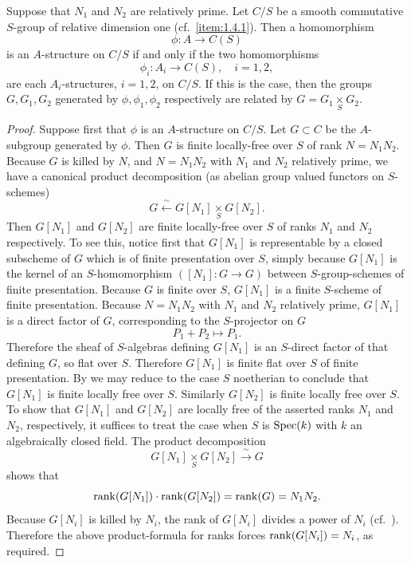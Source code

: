 \begin{proposition}\label{prop:1.7.2}
Suppose that $N_1$ and $N_2$ are relatively prime. Let $C/S$ be a smooth commutative $S$-group of relative dimension one (cf.~\ref{item:1.4.1}). Then a homomorphism
\[
\phi : A \to C(S)
\]
is an $A$-structure on $C/S$ if and only if the two homomorphisms
\[
\phi_i : A_i \to C(S), \quad i = 1, 2,
\]
are each $A_i$-structures, $i = 1, 2$, on $C/S$. If this is the case, then the groups $G, G_1, G_2$ generated by $\phi, \phi_1, \phi_2$ respectively are related by $G = G_1 \underset{S}{\times} G_2$.
\end{proposition}

\begin{proof}
Suppose first that $\phi$ is an $A$-structure on $C/S$. Let $G \subset C$ be the $A$-subgroup generated by $\phi$. Then $G$ is finite locally-free over $S$ of rank $N = N_1 N_2$. Because $G$ is killed by $N$, and $N = N_1 N_2$ with $N_1$ and $N_2$ relatively prime, we have a canonical product decomposition (as abelian group valued functors on $S$-schemes)
\[
G \xleftarrow{\ \sim\ } G[N_1] \underset{S}{\times} G[N_2].
\]
Then $G[N_1]$ and $G[N_2]$ are finite locally-free over $S$ of ranks $N_1$ and $N_2$ respectively. To see this, notice first that $G[N_1]$ is representable by a closed subscheme of $G$ which is of finite presentation over $S$, simply because $G[N_1]$ is the kernel of an $S$-homomorphism $([N_1] : G \to G)$ between $S$-group-schemes of finite presentation. Because $G$ is finite over $S$, $G[N_1]$ is a finite $S$-scheme of finite presentation. Because $N = N_1 N_2$ with $N_1$ and $N_2$ relatively prime, $G[N_1]$ is a direct factor of $G$, corresponding to the $S$-projector on $G$
\[
P_1 + P_2 \mapsto P_1.
\]
Therefore the sheaf of $S$-algebras defining $G[N_1]$ is an $S$-direct factor of that defining $G$, so flat over $S$. Therefore $G[N_1]$ is finite flat over $S$ of finite presentation. By \cite[IV, 8.9.1 and 11.2.6.1]{EGA} we may reduce to the case $S$ noetherian to conclude that $G[N_1]$ is finite locally free over $S$. Similarly $G[N_2]$ is finite locally free over $S$. To show that $G[N_1]$ and $G[N_2]$ are locally free of the asserted ranks $N_1$ and $N_2$, respectively, it suffices to treat the case when $S$ is $\operatorname{Spec}(k)$ with $k$ an algebraically closed field. The product decomposition
\[
G[N_1] \underset{S}{\times} G[N_2] \xrightarrow{\ \sim\ } G
\]
shows that
\[
\operatorname{rank}(G[N_1]) \cdot \operatorname{rank}(G[N_2]) = \operatorname{rank}(G) = N_1 N_2.
\]
Because $G[N_i]$ is killed by $N_i$, the rank of $G[N_i]$ divides a power of $N_i$ (cf.~\cite[IV, \S3, 5.3--9]{DeGa}). Therefore the above product-formula for ranks forces $\operatorname{rank}(G[N_i]) = N_i$, as required.


\end{proof}
